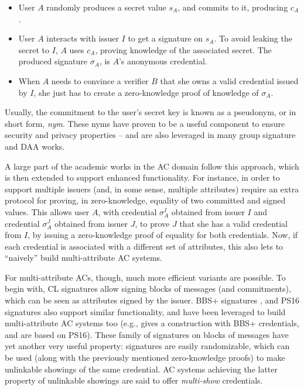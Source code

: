 \begin{itemize}
\item User $A$ randomly produces a secret value $s_A$, and commits to it,
  producing $c_A$.
\item User $A$ interacts with issuer $I$ to get a signature on $s_A$. To
  avoid leaking the secret to $I$, $A$ uses $c_A$, proving knowledge of the
  associated secret. The produced signature $\sigma_A$, is $A$'s anonymous
  credential.
\item When $A$ needs to convince a verifier $B$ that she owns a valid credential
  issued by $I$, she just has to create a zero-knowledge proof of knowledge
  of $\sigma_A$.
\end{itemize}

Usually, the commitment to the user's secret key is known as a pseudonym, or
in short form, \emph{nym}. These nyms have proven to be a useful component to
ensure security and privacy properties -- and are also leveraged in many group
signature and DAA works. 

A large part of the academic works in the AC domain follow this approach, which
is then extended to support enhanced functionality. For instance, in order to
support multiple issuers (and, in some sense, multiple attributes)
\cite{cl01,cl02,cl04}  require an
extra protocol for proving, in zero-knowledge, equality of two committed and signed values.
This allows user $A$, with credential $\sigma_A^I$ obtained from issuer $I$ and
credential $\sigma_A^J$ obtained from issuer $J$, to prove $J$ that she has a
valid credential from $I$, by issuing a zero-knowledge proof of equality for
both credentials. Now, if each credential is associated with a different set of
attributes, this also lets to ``naively'' build multi-attribute AC systems.

For multi-attribute ACs, though, much more efficient variants are possible. To
begin with, CL signatures allow signing blocks of messages (and commitments),
which can be seen as attributes signed by the issuer. BBS+ signatures
\cite{am06,cdl16b}, and PS16 signatures \cite{ps16} also support similar
functionality, and have been leveraged to build multi-attribute AC systems
too (e.g., \cite{cks10} gives a construction with BBS+ credentials, and
\cite{sms+19,halp20} are based on PS16). These family of signatures on blocks
of messages have yet another very useful property: signatures are easily
randomizable, which can be used (along with the previously mentioned
zero-knowledge proofs) to make unlinkable showings of the same credential.
AC systems achieving the latter property of unlinkable showings are said
to offer \emph{multi-show} credentials.


